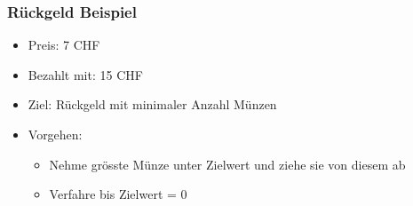 \documentclass[a4paper, landscape, 8pt]{scrartcl}
\begin{document}
\begin{multicols*}{4}
                \subsubsection{Rückgeld Beispiel}
                    \begin{itemize}
                        \item Preis: 7 CHF
                        \item Bezahlt mit: 15 CHF
                        \item Ziel: Rückgeld mit minimaler Anzahl Münzen
                        \item Vorgehen:
                        \begin{itemize}
                            \item Nehme grösste Münze unter Zielwert und ziehe sie von diesem ab
                            \item Verfahre bis Zielwert = 0
                        \end{itemize}
                    \end{itemize}


\end{multicols*}
\end{document}
